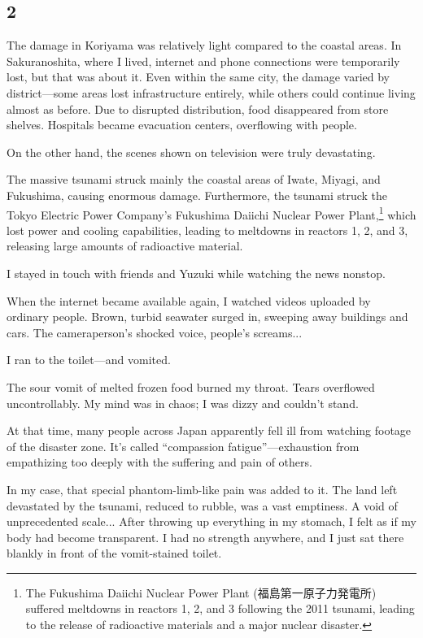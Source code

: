 \documentclass[
    a4paper,
    12pt,
    twoside,
    openany,
    UTF8,
    fontset=windows
]{ctexbook}
\begin{document}
\subsection*{2}

The damage in Koriyama was relatively light compared to the coastal areas. In Sakuranoshita, where I lived, internet and phone connections were temporarily lost, but that was about it. Even within the same city, the damage varied by district---some areas lost infrastructure entirely, while others could continue living almost as before. Due to disrupted distribution, food disappeared from store shelves. Hospitals became evacuation centers, overflowing with people.

On the other hand, the scenes shown on television were truly devastating.

The massive tsunami struck mainly the coastal areas of Iwate, Miyagi, and Fukushima, causing enormous damage. Furthermore, the tsunami struck the Tokyo Electric Power Company's Fukushima Daiichi Nuclear Power Plant,\footnote{The Fukushima Daiichi Nuclear Power Plant (福島第一原子力発電所) suffered meltdowns in reactors 1, 2, and 3 following the 2011 tsunami, leading to the release of radioactive materials and a major nuclear disaster.} which lost power and cooling capabilities, leading to meltdowns in reactors 1, 2, and 3, releasing large amounts of radioactive material.

I stayed in touch with friends and Yuzuki while watching the news nonstop.

When the internet became available again, I watched videos uploaded by ordinary people. Brown, turbid seawater surged in, sweeping away buildings and cars. The cameraperson's shocked voice, people's screams...

I ran to the toilet---and vomited.

The sour vomit of melted frozen food burned my throat. Tears overflowed uncontrollably. My mind was in chaos; I was dizzy and couldn't stand.

At that time, many people across Japan apparently fell ill from watching footage of the disaster zone. It's called ``compassion fatigue''---exhaustion from empathizing too deeply with the suffering and pain of others.

In my case, that special phantom-limb-like pain was added to it. The land left devastated by the tsunami, reduced to rubble, was a vast emptiness. A void of unprecedented scale... After throwing up everything in my stomach, I felt as if my body had become transparent. I had no strength anywhere, and I just sat there blankly in front of the vomit-stained toilet.
\end{document}
